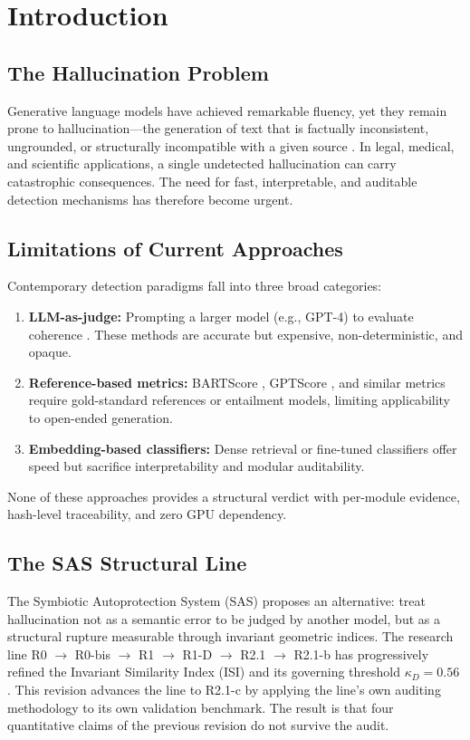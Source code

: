 \documentclass[11pt,a4paper]{article}
\begin{document}
\section{Introduction}
\subsection{The Hallucination Problem}
Generative language models have achieved remarkable fluency, yet they remain prone to hallucination---the generation of text that is factually inconsistent, ungrounded, or structurally incompatible with a given source \citep{ji2023survey}. In legal, medical, and scientific applications, a single undetected hallucination can carry catastrophic consequences. The need for fast, interpretable, and auditable detection mechanisms has therefore become urgent.

\subsection{Limitations of Current Approaches}
Contemporary detection paradigms fall into three broad categories:

\begin{enumerate}
    \item \textbf{LLM-as-judge:} Prompting a larger model (e.g., GPT-4) to evaluate coherence \citep{liu2023geval}. These methods are accurate but expensive, non-deterministic, and opaque.
    \item \textbf{Reference-based metrics:} BARTScore \citep{yuan2021bartscore}, GPTScore \citep{fu2023gptscore}, and similar metrics require gold-standard references or entailment models, limiting applicability to open-ended generation.
    \item \textbf{Embedding-based classifiers:} Dense retrieval or fine-tuned classifiers offer speed but sacrifice interpretability and modular auditability.
\end{enumerate}

None of these approaches provides a structural verdict with per-module evidence, hash-level traceability, and zero GPU dependency.

\subsection{The SAS Structural Line}
The Symbiotic Autoprotection System (SAS) proposes an alternative: treat hallucination not as a semantic error to be judged by another model, but as a structural rupture measurable through invariant geometric indices. The research line R0 $\rightarrow$ R0-bis $\rightarrow$ R1 $\rightarrow$ R1-D $\rightarrow$ R2.1 $\rightarrow$ R2.1-b has progressively refined the Invariant Similarity Index (ISI) and its governing threshold $\kappa_D = 0.56$ \citep{durante2026a,durante2026r0,durante2026r0bis,durante2026r1,durante2026r1d,durante2026r21,durante2026r21b}. This revision advances the line to R2.1-c by applying the line's own auditing methodology to its own validation benchmark. The result is that four quantitative claims of the previous revision do not survive the audit.
\end{document}
